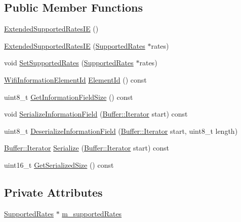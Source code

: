 \subsection*{Public Member Functions}
\begin{DoxyCompactItemize}
\item 
\hyperlink{classns3_1_1ExtendedSupportedRatesIE_a7dfcd7864650f76286f38bf1a15f84ae}{Extended\+Supported\+Rates\+IE} ()
\item 
\hyperlink{classns3_1_1ExtendedSupportedRatesIE_adc4caaf39f581f5d6c88e6bb4fc5cab5}{Extended\+Supported\+Rates\+IE} (\hyperlink{classns3_1_1SupportedRates}{Supported\+Rates} $\ast$rates)
\item 
void \hyperlink{classns3_1_1ExtendedSupportedRatesIE_a6d8c66b3b437f590146ad0faed4a284c}{Set\+Supported\+Rates} (\hyperlink{classns3_1_1SupportedRates}{Supported\+Rates} $\ast$rates)
\item 
\hyperlink{namespacens3_aeb185e0c8a60816016bca079f1420478}{Wifi\+Information\+Element\+Id} \hyperlink{classns3_1_1ExtendedSupportedRatesIE_a51953814368938411f5e052248806b64}{Element\+Id} () const 
\item 
uint8\+\_\+t \hyperlink{classns3_1_1ExtendedSupportedRatesIE_a1d7b1816dbccec8f4a603e7b598ac382}{Get\+Information\+Field\+Size} () const 
\item 
void \hyperlink{classns3_1_1ExtendedSupportedRatesIE_aaf03b8e934437fdd9a7d9d69f49adb26}{Serialize\+Information\+Field} (\hyperlink{classns3_1_1Buffer_1_1Iterator}{Buffer\+::\+Iterator} start) const 
\item 
uint8\+\_\+t \hyperlink{classns3_1_1ExtendedSupportedRatesIE_af35d306abad399d0fb7bc0e5986693d3}{Deserialize\+Information\+Field} (\hyperlink{classns3_1_1Buffer_1_1Iterator}{Buffer\+::\+Iterator} start, uint8\+\_\+t length)
\item 
\hyperlink{classns3_1_1Buffer_1_1Iterator}{Buffer\+::\+Iterator} \hyperlink{classns3_1_1ExtendedSupportedRatesIE_acb470467b1268b5897cdc916078f2b46}{Serialize} (\hyperlink{classns3_1_1Buffer_1_1Iterator}{Buffer\+::\+Iterator} start) const 
\item 
uint16\+\_\+t \hyperlink{classns3_1_1ExtendedSupportedRatesIE_ad45ba92aa57744b1f6fd3466bd4baf7b}{Get\+Serialized\+Size} () const 
\end{DoxyCompactItemize}
\subsection*{Private Attributes}
\begin{DoxyCompactItemize}
\item 
\hyperlink{classns3_1_1SupportedRates}{Supported\+Rates} $\ast$ \hyperlink{classns3_1_1ExtendedSupportedRatesIE_a368d0fc67f15b3c677075ffb54910d5c}{m\+\_\+supported\+Rates}
\end{DoxyCompactItemize}
